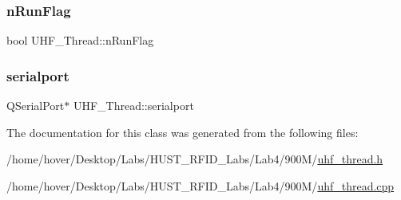 \mbox{\label{class_u_h_f___thread_ab40811b93c5e8b31c4f40cc79139e504}} 
\subsubsection{\texorpdfstring{nRunFlag}{nRunFlag}}
{\footnotesize\ttfamily bool U\+H\+F\+\_\+\+Thread\+::n\+Run\+Flag}

\mbox{\label{class_u_h_f___thread_a20904e9764b311fdb015c3fd6cbec497}} 
\subsubsection{\texorpdfstring{serialport}{serialport}}
{\footnotesize\ttfamily Q\+Serial\+Port$\ast$ U\+H\+F\+\_\+\+Thread\+::serialport\hspace{0.3cm}{\ttfamily [private]}}



The documentation for this class was generated from the following files\+:\begin{DoxyCompactItemize}
\item 
/home/hover/\+Desktop/\+Labs/\+H\+U\+S\+T\+\_\+\+R\+F\+I\+D\+\_\+\+Labs/\+Lab4/900\+M/\mbox{\hyperlink{uhf__thread_8h}{uhf\+\_\+thread.\+h}}\item 
/home/hover/\+Desktop/\+Labs/\+H\+U\+S\+T\+\_\+\+R\+F\+I\+D\+\_\+\+Labs/\+Lab4/900\+M/\mbox{\hyperlink{uhf__thread_8cpp}{uhf\+\_\+thread.\+cpp}}\end{DoxyCompactItemize}

